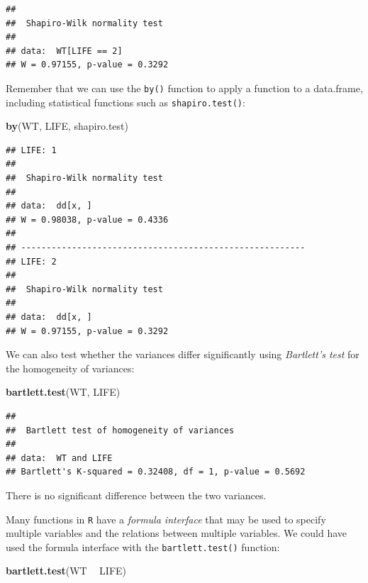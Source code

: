 \documentclass[12pt,]{book}
\newenvironment{Shaded}{\begin{snugshade}}{\end{snugshade}}
\newcommand{\KeywordTok}[1]{\textcolor[rgb]{0.13,0.29,0.53}{\textbf{#1}}}
\newcommand{\StringTok}[1]{\textcolor[rgb]{0.31,0.60,0.02}{#1}}
\newcommand{\OperatorTok}[1]{\textcolor[rgb]{0.81,0.36,0.00}{\textbf{#1}}}
\newcommand{\NormalTok}[1]{#1}
\theoremstyle{definition}
\theoremstyle{definition}
\theoremstyle{definition}
\theoremstyle{remark}
\begin{document}
\begin{verbatim}
## 
##  Shapiro-Wilk normality test
## 
## data:  WT[LIFE == 2]
## W = 0.97155, p-value = 0.3292
\end{verbatim}

Remember that we can use the \texttt{by()} function to apply a function
to a data.frame, including statistical functions such as
\texttt{shapiro.test()}:

\begin{Shaded}
\begin{Highlighting}[]
\KeywordTok{by}\NormalTok{(WT, LIFE, shapiro.test)}
\end{Highlighting}
\end{Shaded}

\begin{verbatim}
## LIFE: 1
## 
##  Shapiro-Wilk normality test
## 
## data:  dd[x, ]
## W = 0.98038, p-value = 0.4336
## 
## -------------------------------------------------------- 
## LIFE: 2
## 
##  Shapiro-Wilk normality test
## 
## data:  dd[x, ]
## W = 0.97155, p-value = 0.3292
\end{verbatim}

We can also test whether the variances differ significantly using
\emph{Bartlett's test} for the homogeneity of variances:

\begin{Shaded}
\begin{Highlighting}[]
\KeywordTok{bartlett.test}\NormalTok{(WT, LIFE)}
\end{Highlighting}
\end{Shaded}

\begin{verbatim}
## 
##  Bartlett test of homogeneity of variances
## 
## data:  WT and LIFE
## Bartlett's K-squared = 0.32408, df = 1, p-value = 0.5692
\end{verbatim}

There is no significant difference between the two variances.

Many functions in \texttt{R} have a \emph{formula interface} that may be
used to specify multiple variables and the relations between multiple
variables. We could have used the formula interface with the
\texttt{bartlett.test()} function:

\begin{Shaded}
\begin{Highlighting}[]
\KeywordTok{bartlett.test}\NormalTok{(WT }\OperatorTok{~}\StringTok{ }\NormalTok{LIFE)}
\end{Highlighting}
\end{Shaded}
\end{document}
